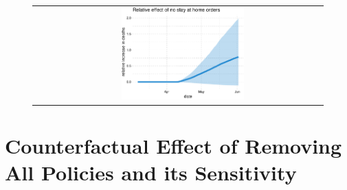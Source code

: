 \documentclass[11pt,reqno,letter]{amsart}
\theoremstyle{definition}
\begin{document}
\begin{figure}[ht]
\begin{minipage}{\linewidth}
\begin{tabular}{cc}
      &
        \includegraphics[width=0.45\textwidth]{tables_and_figures/us-shelter-rel_deaths_v1}
    \end{tabular}
  \end{minipage}
\end{figure}




\section{Counterfactual Effect of Removing All Policies and its Sensitivity}\label{removing-policies}





\end{document}
